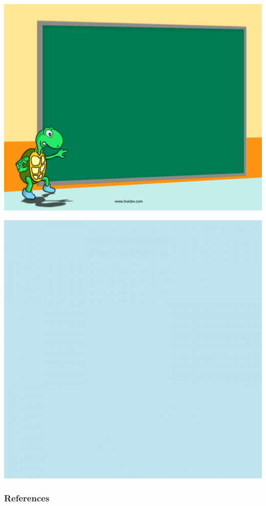 \documentclass[mathserif, handout]{beamer}
\begin{document}
\usebackgroundtemplate
{
  \includegraphics[width=\paperwidth,height=\paperheight]{lastpage.jpg}%
}
\begin{frame}


\end{frame}


\usebackgroundtemplate
{
  \includegraphics[width=\paperwidth,height=\paperheight]{background.jpg}%
}

\begin{frame}[t, allowframebreaks]
  \frametitle{References}
  \printbibliography
\end{frame}
\end{document}
